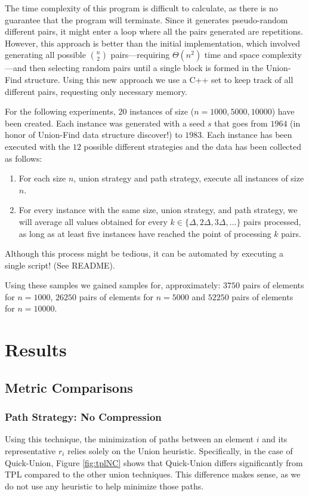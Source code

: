 The time complexity of this program is difficult to calculate, as there is no guarantee that the program will terminate. Since it generates pseudo-random different pairs, it might enter a loop where all the pairs generated are repetitions. However, this approach is better than the initial implementation, which involved generating all possible \(n \choose 2 \) pairs—requiring \( \Theta(n^2) \) time and space complexity—and then selecting random pairs until a single block is formed in the Union-Find structure. Using this new approach we use a C++ set to keep track of all different pairs, requesting only necessary memory.

For the following experiments, $20$ instances of size ($n = 1000, 5000, 10000$) have been created. Each instance was generated with a seed $s$ that goes from $1964$ (in honor of Union-Find data structure discover!) to $1983$. Each instance has been executed with the $12$ possible different strategies and the data has been collected as follows:

\begin{enumerate}
    \item For each size \( n \), union strategy and path strategy, execute all instances of size \( n \).
    \item For every instance with the same size, union strategy, and path strategy, we will average all values obtained for every \( k \in \{\Delta, 2\Delta, 3\Delta, \ldots\} \) pairs processed, as long as at least five instances have reached the point of processing \( k \) pairs.
\end{enumerate}

Although this process might be tedious, it can be automated by executing a single script! (See README).

Using these samples we gained samples for, approximately: $3750$ pairs of elements for $n = 1000$, $26250$ pairs of elements for $n = 5000$ and $52250$ pairs of elements for $n = 10000$. 

\section{Results}
\subsection{Metric Comparisons}
\subsubsection{Path Strategy: No Compression}
Using this technique, the minimization of paths between an element $i$ and its representative $r_i$ relies solely on the Union heuristic. Specifically, in the case of Quick-Union, Figure \ref{fig:tplNC} shows that Quick-Union differs significantly from TPL compared to the other union techniques. This difference makes sense, as we do not use any heuristic to help minimize those paths. 

